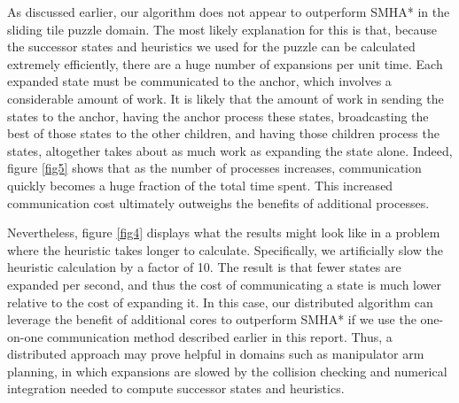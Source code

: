 \documentclass[11pt]{article}
\begin{document}
{As discussed earlier, our algorithm does not appear to outperform SMHA* in the sliding tile puzzle domain. The most likely explanation for this is that, because the successor states and heuristics we used for the puzzle can be calculated extremely efficiently, there are a huge number of expansions per unit time. Each expanded state must be communicated to the anchor, which involves a considerable amount of work. It is likely that the amount of work in sending the states to the anchor, having the anchor process these states, broadcasting the best of those states to the other children, and having those children process the states, altogether takes about as much work as expanding the state alone. Indeed, figure \ref{fig5} shows that as the number of processes increases, communication quickly becomes a huge fraction of the total time spent. This increased communication cost ultimately outweighs the benefits of additional processes.

Nevertheless, figure \ref{fig4} displays what the results might look like in a problem where the heuristic takes longer to calculate. Specifically, we artificially slow the heuristic calculation by a factor of 10. The result is that fewer states are expanded per second, and thus the cost of communicating a state is much lower relative to the cost of expanding it. In this case, our distributed algorithm can leverage the benefit of additional cores to outperform SMHA* if we use the one-on-one communication method described earlier in this report. Thus, a distributed approach may prove helpful in domains such as manipulator arm planning, in which expansions are slowed by the collision checking and numerical integration needed to compute successor states and heuristics.


}
\end{document}
